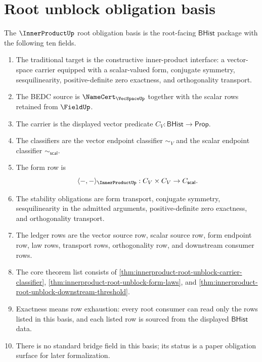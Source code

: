 \section{Root unblock obligation basis}
\label{sec:innerproduct-root-unblock-obligation-basis}

\begin{definition}
\label{def:innerproduct-root-unblock-obligation-basis}
The $\InnerProductUp$ root obligation basis is the root-facing
$\mathsf{BHist}$ package with the following ten fields.
\begin{enumerate}
  \item The traditional target is the constructive inner-product interface:
  a vector-space carrier equipped with a scalar-valued form, conjugate
  symmetry, sesquilinearity, positive-definite zero exactness, and
  orthogonality transport.
  \item The BEDC source is $\NameCert_{\VecSpaceUp}$ together with the
  scalar rows retained from $\FieldUp$.
  \item The carrier is the displayed vector predicate
  $C_V:\mathsf{BHist}\to\mathsf{Prop}$.
  \item The classifiers are the vector endpoint classifier $\sim_V$ and the
  scalar endpoint classifier $\sim_{\mathsf{scal}}$.
  \item The form row is
  $$
  \langle-,-\rangle_{\InnerProductUp}:C_V\times C_V\to C_{\mathsf{scal}}.
  $$
  \item The stability obligations are form transport, conjugate symmetry,
  sesquilinearity in the admitted arguments, positive-definite zero
  exactness, and orthogonality transport.
  \item The ledger rows are the vector source row, scalar source row, form
  endpoint row, law rows, transport rows, orthogonality row, and downstream
  consumer rows.
  \item The core theorem list consists of
  \autoref{thm:innerproduct-root-unblock-carrier-classifier},
  \autoref{thm:innerproduct-root-unblock-form-laws}, and
  \autoref{thm:innerproduct-root-unblock-downstream-threshold}.
  \item Exactness means row exhaustion: every root consumer can read only the
  rows listed in this basis, and each listed row is sourced from the displayed
  $\mathsf{BHist}$ data.
  \item There is no standard bridge field in this basis; its status is a
  paper obligation surface for later formalization.
\end{enumerate}
\end{definition}

